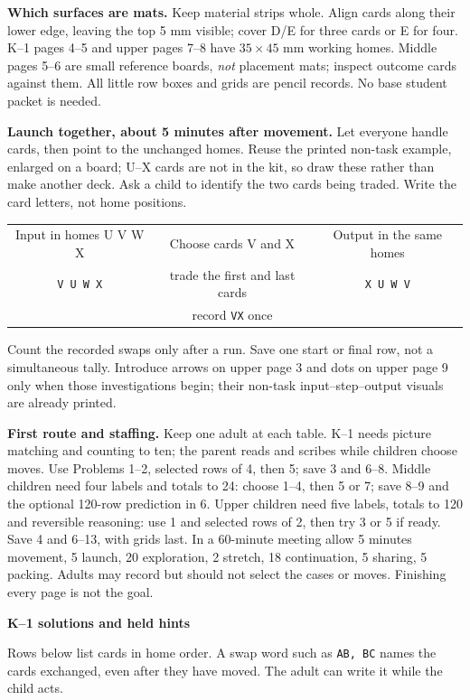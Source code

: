 \documentclass[11pt]{article}
\newcommand{\head}[1]{\par\textbf{\large #1}\par}
\newcommand{\row}[1]{\texttt{#1}}
\begin{document}
\textbf{Which surfaces are mats.} Keep material strips whole. Align cards along their lower edge, leaving the top 5 mm visible; cover D/E for three cards or E for four. K--1 pages 4--5 and upper pages 7--8 have $35\times45$ mm working homes. Middle pages 5--6 are small reference boards, \emph{not} placement mats; inspect outcome cards against them. All little row boxes and grids are pencil records. No base student packet is needed.

\textbf{Launch together, about 5 minutes after movement.} Let everyone handle cards, then point to the unchanged homes. Reuse the printed non-task example, enlarged on a board; U--X cards are not in the kit, so draw these rather than make another deck. Ask a child to identify the two cards being traded. Write the card letters, not home positions.
\begin{center}\small
\begin{tabular}{ccc}
Input in homes U V W X & Choose cards V and X & Output in the same homes\\[3pt]
\row{V U W X} & trade the first and last cards & \row{X U W V}\\
 & record \row{VX} once &
\end{tabular}
\end{center}
Count the recorded swaps only after a run. Save one start or final row, not a simultaneous tally. Introduce arrows on upper page 3 and dots on upper page 9 only when those investigations begin; their non-task input--step--output visuals are already printed.

\textbf{First route and staffing.} Keep one adult at each table. K--1 needs picture matching and counting to ten; the parent reads and scribes while children choose moves. Use Problems 1--2, selected rows of 4, then 5; save 3 and 6--8. Middle children need four labels and totals to 24: choose 1--4, then 5 or 7; save 8--9 and the optional 120-row prediction in 6. Upper children need five labels, totals to 120 and reversible reasoning: use 1 and selected rows of 2, then try 3 or 5 if ready. Save 4 and 6--13, with grids last. In a 60-minute meeting allow 5 minutes movement, 5 launch, 20 exploration, 2 stretch, 18 continuation, 5 sharing, 5 packing. Adults may record but should not select the cases or moves. Finishing every page is not the goal.
\newpage
\head{K--1 solutions and held hints}
Rows below list cards in home order. A swap word such as \row{AB, BC} names the cards exchanged, even after they have moved. The adult can write it while the child acts.
\end{document}
